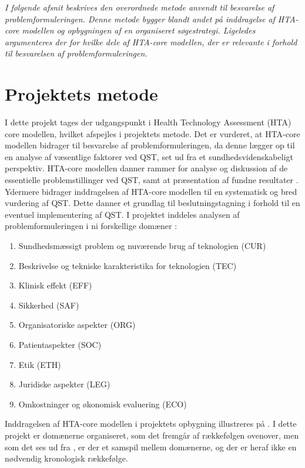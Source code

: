 \textit{I følgende afsnit beskrives den overordnede metode anvendt til besvarelse af problemformuleringen. Denne metode bygger blandt andet på inddragelse af HTA-core modellen og opbygningen af en organiseret søgestrategi. Ligeledes argumenteres der for hvilke dele af HTA-core modellen, der er relevante i forhold til besvarelsen af problemformuleringen.}

\section{Projektets metode}
I dette projekt tages der udgangspunkt i Health Technology Assessment (HTA) core modellen, hvilket afspejles i projektets metode. Det er vurderet, at HTA-core modellen bidrager til besvarelse af problemformuleringen, da denne lægger op til en analyse af væsentlige faktorer ved QST, set ud fra et sundhedsvidenskabeligt perspektiv. HTA-core modellen danner rammer for analyse og diskussion af de essentielle problemstillinger ved QST, samt at præsentation af fundne resultater \citep{HTAcore}. Ydermere bidrager inddragelsen af HTA-core modellen til en systematisk og bred vurdering af QST. Dette danner et grundlag til beslutningstagning i forhold til en eventuel implementering af QST. \citep{metodehaandbogen} \citep{HTAcore} I projektet inddeles analysen af problemformuleringen i ni forskellige domæner \citep{HTAcore}:

\begin{enumerate}
\item Sundhedsmæssigt problem og nuværende brug af teknologien (CUR)
\item Beskrivelse og tekniske karakteristika for teknologien (TEC)
\item Klinisk effekt (EFF)
\item Sikkerhed (SAF)
\item Organisatoriske aspekter (ORG)
\item Patientaspekter (SOC)
\item Etik (ETH)
\item Juridiske aspekter (LEG)
\item Omkostninger og økonomisk evaluering (ECO)
\end{enumerate}

Inddragelsen af HTA-core modellen i projektets opbygning illustreres på . I dette projekt er domænerne organiseret, som det fremgår af rækkefølgen ovenover, men som det ses ud fra , er der et samspil mellem domænerne, og der er heraf ikke en nødvendig kronologisk rækkefølge.

